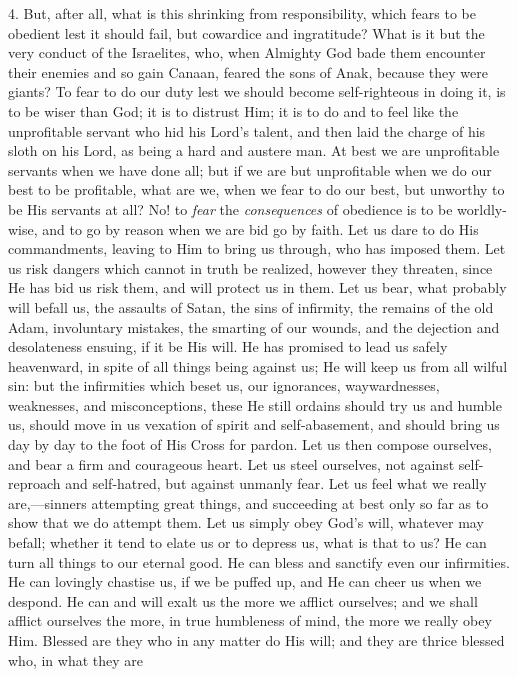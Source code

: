 4. But, after all, what is this shrinking from responsibility,
which fears to be obedient lest it should fail, but cowardice and
ingratitude? What is it but the very conduct of the Israelites, who,
when Almighty God bade them encounter their enemies and so gain
Canaan, feared the sons of Anak, because they were giants? To fear to
do our duty lest we should become self-righteous in doing it, is to be
wiser than God; it is to distrust Him; it is to do and to feel like
the unprofitable servant who hid his Lord's talent, and then laid the
charge of his sloth on his Lord, as being a hard and austere man. At
best we are unprofitable servants when we have done all; but if we are
but unprofitable when we do our best to be profitable, what are we,
when we fear to do our best, but unworthy to be His servants at all?
No! to \emph{fear} the \emph{consequences} of obedience is to be
worldly-wise, and to go by reason when we are bid go by faith. Let us
dare to do His commandments, leaving to Him to bring us through, who
has imposed them. Let us risk dangers which cannot in truth be
realized, however they threaten, since He has bid us risk them, and
will protect us in them. Let us bear, what probably will befall us,
the assaults of Satan, the sins of infirmity, the remains of the old
Adam, involuntary mistakes, the smarting of our wounds, and the
dejection and desolateness ensuing, if it be His will. He has promised
to lead us safely heavenward, in spite of all things being against us;
He will keep us from all wilful sin: but the infirmities which beset
us, our ignorances, waywardnesses, weaknesses, and misconceptions,
these He still ordains should try us and humble us, should move in us
vexation of spirit and self-abasement, and should bring us day by day
to the foot of His Cross for pardon. Let us then compose ourselves,
and bear a firm and courageous heart. Let us steel ourselves, not
against self-reproach and self-hatred, but against unmanly fear. Let
us feel what we really are,—sinners attempting great things, and
succeeding at best only so far as to show that we do attempt them. Let
us simply obey God's will, whatever may befall; whether it tend to
elate us or to depress us, what is that to us? He can turn all things
to our eternal good. He can bless and sanctify even our infirmities.
He can lovingly chastise us, if we be puffed up, and He can cheer us
when we despond. He can and will exalt us the more we afflict
ourselves; and we shall afflict ourselves the more, in true humbleness
of mind, the more we really obey Him. Blessed are they who in any
matter do His will; and they are thrice blessed who, in what they are
